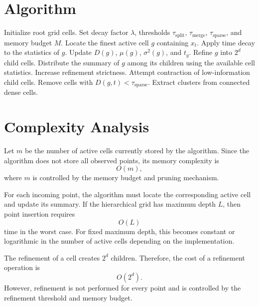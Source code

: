 \documentclass[11pt]{article}
\begin{document}
\section{Algorithm}

\begin{algorithm}[t]
\caption{Adaptive Multi-Resolution Grid Stream Clustering}
\label{alg:adaptive-grid}
\begin{algorithmic}[1]
\STATE Initialize root grid cells.
\STATE Set decay factor $\lambda$, thresholds $\tau_{\text{split}}$, $\tau_{\text{merge}}$, $\tau_{\text{sparse}}$, and memory budget $M$.
    \STATE Locate the finest active cell $g$ containing $x_t$.
    \STATE Apply time decay to the statistics of $g$.
    \STATE Update $D(g)$, $\mu(g)$, $\sigma^2(g)$, and $t_g$.
        \STATE Refine $g$ into $2^d$ child cells.
        \STATE Distribute the summary of $g$ among its children using the available cell statistics.
    \ENDIF
        \STATE Increase refinement strictness.
        \STATE Attempt contraction of low-information child cells.
    \ENDIF
        \STATE Remove cells with $D(g,t) < \tau_{\text{sparse}}$.
    \ENDIF
\ENDFOR
\STATE Extract clusters from connected dense cells.
\end{algorithmic}
\end{algorithm}

\section{Complexity Analysis}

Let $m$ be the number of active cells currently stored by the algorithm. Since the algorithm does not store all observed points, its memory complexity is
\[
O(m),
\]
where $m$ is controlled by the memory budget and pruning mechanism.

For each incoming point, the algorithm must locate the corresponding active cell and update its summary. If the hierarchical grid has maximum depth $L$, then point insertion requires
\[
O(L)
\]
time in the worst case. For fixed maximum depth, this becomes constant or logarithmic in the number of active cells depending on the implementation.

The refinement of a cell creates $2^d$ children. Therefore, the cost of a refinement operation is
\[
O(2^d).
\]
However, refinement is not performed for every point and is controlled by the refinement threshold and memory budget.
\end{document}
